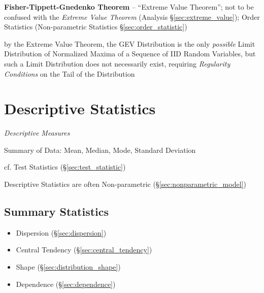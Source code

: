 \textbf{Fisher-Tippett-Gnedenko Theorem} -- ``Extreme Value Theorem''; not to be
confused with the \emph{Extreme Value Theorem} (Analysis
\S\ref{sec:extreme_value}); Order Statistics (Non-parametric Statistics
\S\ref{sec:order_statistic})

by the Extreme Value Theorem, the GEV Distribution is the only \emph{possible}
Limit Distribution of Normalized Maxima of a Sequence of IID Random Variables,
but such a Limit Distribution does not necessarily exist, requiring
\emph{Regularity Conditions} on the Tail of the Distribution



\section{Descriptive Statistics}\label{sec:descriptive_statistics}

\emph{Descriptive Measures}

Summary of Data: Mean, Median, Mode, Standard Deviation

cf. Test Statistics (\S\ref{sec:test_statistic})

Descriptive Statistics are often Non-parametric
(\S\ref{sec:nonparametric_model})



\subsection{Summary Statistics}\label{sec:summary_statistics}


\begin{itemize}
  \item Dispersion (\S\ref{sec:dispersion})
  \item Central Tendency (\S\ref{sec:central_tendency})
  \item Shape (\S\ref{sec:distribution_shape})
  \item Dependence (\S\ref{sec:dependence})
\end{itemize}

